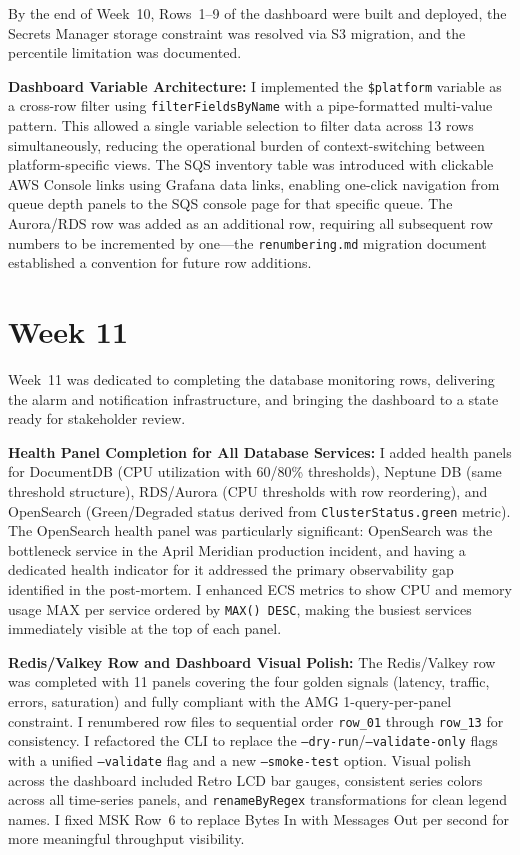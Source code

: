 By the end of Week~10, Rows~1--9 of the dashboard were built
and deployed, the Secrets Manager storage constraint was resolved
via S3 migration, and the percentile limitation was documented.

\textbf{Dashboard Variable Architecture:} 
I implemented the \texttt{\$platform} variable
as a cross-row filter using \texttt{filterFieldsByName}
with a pipe-formatted multi-value pattern. This allowed a single variable
selection to filter data across 13 rows simultaneously, reducing the
operational burden of context-switching between platform-specific views.
The SQS inventory table was introduced with clickable AWS Console links
using Grafana data links, enabling one-click navigation from queue depth
panels to the SQS console page for that specific queue. The Aurora/RDS
row was added as an additional row, requiring all subsequent
row numbers to be incremented by one---the \texttt{renumbering.md}
migration document established a convention for future row additions.


\FloatBarrier

\section{Week 11}
\label{sec:week11}

Week~11 was dedicated to completing the database monitoring rows,
delivering the alarm and notification infrastructure, and bringing
the dashboard to a state ready for stakeholder review.

\textbf{Health Panel Completion for All Database Services:} 
I added health panels for DocumentDB (CPU
utilization with 60/80\% thresholds), Neptune DB (same threshold
structure), RDS/Aurora (CPU thresholds with row reordering), and
OpenSearch (Green/Degraded status derived from \texttt{ClusterStatus.green}
metric). The OpenSearch health panel was particularly significant:
OpenSearch was the bottleneck service in the April Meridian production incident,
and having a dedicated health indicator for it addressed the primary
observability gap identified in the post-mortem. I enhanced ECS metrics to show CPU and memory usage MAX per service
ordered by \texttt{MAX() DESC}, making the busiest services immediately
visible at the top of each panel.

\textbf{Redis/Valkey Row and Dashboard Visual Polish:} 
The Redis/Valkey row was completed with 11 panels covering
the four golden signals (latency, traffic, errors, saturation) and fully
compliant with the AMG 1-query-per-panel constraint. I renumbered row files to sequential order \texttt{row\_01} through
\texttt{row\_13} for consistency. I refactored the CLI to replace the
\texttt{--dry-run}/\texttt{--validate-only} flags with a unified
\texttt{--validate} flag and a new \texttt{--smoke-test} option.
Visual polish across the dashboard included Retro LCD bar gauges,
consistent series colors across all time-series panels, and
\texttt{renameByRegex} transformations for clean legend names.
I fixed MSK Row~6 to replace Bytes In with Messages Out per
second for more meaningful throughput visibility.

